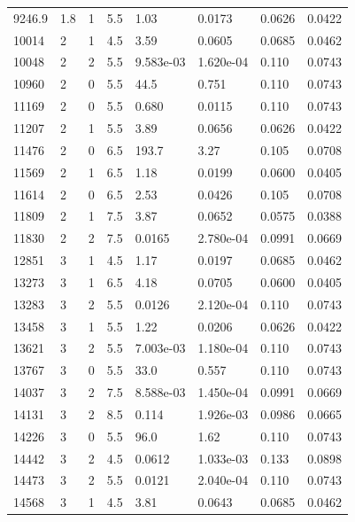 \documentclass[preview]{standalone}
\begin{document}
{{{\begin{tabular}{L{1.2cm}C{1.2cm} C{0.3cm}C{0.5cm} C{1.4cm}C{1.4cm} C{1.4cm}C{1.4cm}}
  9246.9  &   1.8  & 1     & 5.5 &  1.03  & 0.0173  & 0.0626 &  0.0422   \\ 
  10014  &     2  & 1     & 4.5 &  3.59  & 0.0605  & 0.0685 &  0.0462   \\ 
  10048  &     2  & 2     & 5.5 &  9.583e-03  & 1.620e-04  & 0.110 &  0.0743   \\ 
  10960  &     2  & 0     & 5.5 &  44.5  & 0.751  & 0.110 &  0.0743   \\ 
  11169  &     2  & 0     & 5.5 &  0.680  & 0.0115  & 0.110 &  0.0743   \\ 
  11207  &     2  & 1     & 5.5 &  3.89  & 0.0656  & 0.0626 &  0.0422   \\ 
  11476  &     2  & 0     & 6.5 &  193.7  & 3.27  & 0.105 &  0.0708   \\ 
  11569  &     2  & 1     & 6.5 &  1.18  & 0.0199  & 0.0600 &  0.0405   \\ 
  11614  &     2  & 0     & 6.5 &  2.53  & 0.0426  & 0.105 &  0.0708   \\ 
  11809  &     2  & 1     & 7.5 &  3.87  & 0.0652  & 0.0575 &  0.0388   \\ 
  11830  &     2  & 2     & 7.5 &  0.0165  & 2.780e-04  & 0.0991 &  0.0669   \\ 
  12851  &     3  & 1     & 4.5 &  1.17  & 0.0197  & 0.0685 &  0.0462   \\ 
  13273  &     3  & 1     & 6.5 &  4.18  & 0.0705  & 0.0600 &  0.0405   \\ 
  13283  &     3  & 2     & 5.5 &  0.0126  & 2.120e-04  & 0.110 &  0.0743   \\ 
  13458  &     3  & 1     & 5.5 &  1.22  & 0.0206  & 0.0626 &  0.0422   \\ 
  13621  &     3  & 2     & 5.5 &  7.003e-03  & 1.180e-04  & 0.110 &  0.0743   \\ 
  13767  &     3  & 0     & 5.5 &  33.0  & 0.557  & 0.110 &  0.0743   \\ 
  14037  &     3  & 2     & 7.5 &  8.588e-03  & 1.450e-04  & 0.0991 &  0.0669   \\ 
  14131  &     3  & 2     & 8.5 &  0.114  & 1.926e-03  & 0.0986 &  0.0665   \\ 
  14226  &     3  & 0     & 5.5 &  96.0  & 1.62  & 0.110 &  0.0743   \\ 
  14442  &     3  & 2     & 4.5 &  0.0612  & 1.033e-03  & 0.133 &  0.0898   \\ 
  14473  &     3  & 2     & 5.5 &  0.0121  & 2.040e-04  & 0.110 &  0.0743   \\ 
  14568  &     3  & 1     & 4.5 &  3.81  & 0.0643  & 0.0685 &  0.0462   \\ 

\end{tabular}}}}
\end{document}
